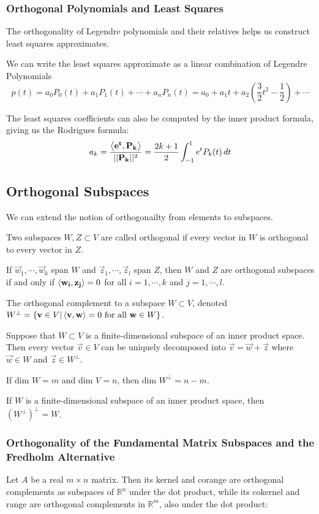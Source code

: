         \subsubsection{Orthogonal Polynomials and Least Squares}
        The orthogonality of Legendre polynomials and their relatives helps us construct least squares approximates.

        We can write the least squares approximate as a linear combination of Legendre Polynomials
            \[ p(t) = a_0 P_0(t) + a_1P_1(t) + \cdots + a_n P_n(t) = a_0 + a_1 t + a_2(\frac{3}{2} t^2 - \frac{1}{2}) + \cdots \]

        The least squares coefficients can also be computed by the inner product formula, giving us the Rodrigues formula:
            \[ a_k = \frac{\left\langle \mathbf{e^t}, \mathbf{P_k} \right\rangle }{\lvert \lvert \mathbf{P_k} \rvert \rvert^2} = \frac{2k + 1}{2} \int^1_{-1} e^t P_k(t) \, dt \]

    \subsection{Orthogonal Subspaces}
    We can extend the notion of orthogonailty from elements to subspaces.

    Two subspaces $W,Z \subset V$ are called orthogonal if every vector in $W$ is orthogonal to every vector in $Z$.

    If $\vec{w}_1, \cdots, \vec{w}_k$ span $W$ and $\vec{z}_1, \cdots, \vec{z}_l$ span $Z$, then $W$ and $Z$ are orthogonal subspaces if and only if $\left\langle \mathbf{w_i}, \mathbf{z_j} \right\rangle = 0$ for all $i = 1, \cdots, k$ and $j = 1, \cdots, l$.

    The orthogonal complement to a subspace $W \subset V$, denoted $W^\bot = \{ \mathbf{v} \in V | \left\langle \mathbf{v}, \mathbf{w} \right\rangle = 0 \text{ for all } \mathbf{w} \in W \}$.

    Suppose that $W \subset V$ is a finite-dimensional subspace of an inner product space. Then every vector $\vec{v} \in V$ can be uniquely decomposed into $\vec{v} = \vec{w} + \vec{z}$ where $\vec{w} \in W$ and $\vec{z} \in W^\bot$.

    If dim $W = m$ and dim $V = n$, then dim $W^\bot = n - m$.

    If $W$ is a finite-dimensional subspace of an inner product space, then ${(W^\bot)}^\bot = W$.

        \subsubsection{Orthogonality of the Fundamental Matrix Subspaces and the Fredholm Alternative}
        Let $A$ be a real $m \times n$ matrix. Then its kernel and corange are orthogonal complements as subspaces of $\mathbb{R}^n$ under the dot product, while its cokernel and range are orthogonal complements in $\mathbb{R}^m$, also under the dot product:

